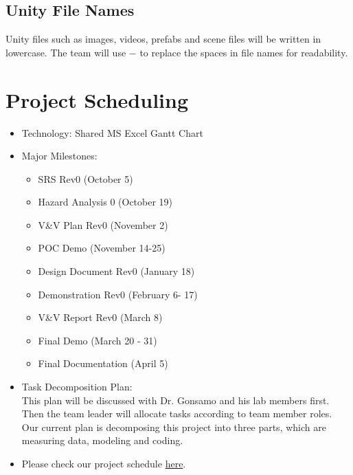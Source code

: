 \documentclass{article}
\begin{document}
\subsection{Unity File Names}
Unity files such as images, videos, prefabs and scene files will be written in lowercase. The team will use $-$ to replace the spaces in file names for readability.   

\section{Project Scheduling}
\begin{itemize}
    \item Technology: Shared MS Excel Gantt Chart
    \item Major Milestones: 
    \begin{itemize}
        \item SRS Rev0 (October 5)
        \item Hazard Analysis 0 (October 19)
        \item V\&V Plan Rev0 (November 2)
        \item POC Demo (November 14-25)
        \item Design Document Rev0 (January 18)
        \item Demonstration Rev0 (February 6- 17)
        \item V\&V Report Rev0  (March 8)
        \item Final Demo (March 20 - 31)
        \item Final Documentation (April 5)
    \end{itemize}
    \item Task Decomposition Plan:\\ This plan will be discussed with Dr. Gonsamo and his lab
    members first. Then the team leader will allocate tasks according to team member roles. 
    Our current plan is decomposing this project into three parts, which are measuring data, modeling
    and coding.
    \item Please check our project schedule \href{https://github.com/wuj187/DigitalTwinCAS/tree/main/docs/DevelopmentPlan/Project_Schedule}{here}.
\end{itemize}
\end{document}
